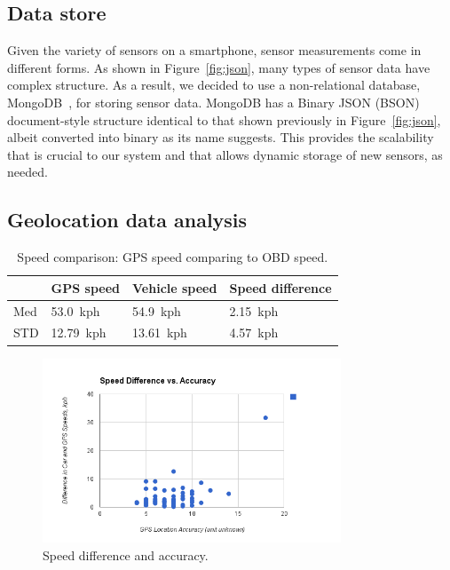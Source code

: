 \subsection{Data store}
Given the variety of sensors on a smartphone,
sensor measurements come in different forms. 
As shown in Figure~\ref{fig:json}, many types of sensor data have complex structure.
As a result, we decided to use a non-relational database, 
MongoDB~\cite{mongodb}, for storing sensor data. MongoDB has a Binary 
JSON (BSON) document-style structure identical to that shown previously 
in Figure~\ref{fig:json}, albeit converted into binary as its name suggests. 
This provides the scalability that is crucial to our system and that allows dynamic storage of 
new sensors, as needed. 

\subsection{Geolocation data analysis}

\begin{table}
\scriptsize
\centering
\begin{tabular}{|p{}|p{}|p{}|p{}|}
\cline{2-4}


\multicolumn{1}{c|}{}  & \textbf{GPS speed} & \textbf{Vehicle speed} & \textbf{Speed difference}  \\ \hline


Med & 53.0~kph & 54.9~kph & 2.15~kph \\ \hline

STD & 12.79~kph & 13.61~kph & 4.57~kph  \\ \hline

\end{tabular}
\caption{\small Speed comparison: GPS speed comparing to OBD speed.}
\label{tab:speed-diff}
\end{table}

\begin{figure}
\centering
\includegraphics[width=3.5in]{speed.png}
\caption{Speed difference and accuracy.}
\label{fig:speed-diff}
\end{figure}

